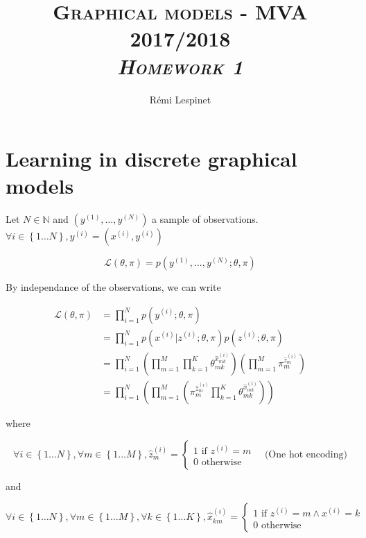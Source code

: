 \documentclass[a4paper, 11pt]{article}
\title{\textsc{Graphical models - MVA 2017/2018 \\ \emph{Homework 1}} }
\author{Rémi Lespinet}
\date{}
\newcommand{\intn}[2]{\left\{ #1 \dots #2 \right\}}
\begin{document}
\maketitle
\thispagestyle{fancy}

\section{Learning in discrete graphical models}

Let $N \in \mathbb{N}$ and $\left(y^{(1)}, \dots, y^{(N)}\right)$ a sample
of observations. $\forall i \in \intn{1}{N}, y^{(i)} = (x^{(i)}, y^{(i)})$

\begin{equation*}
  \mathcal{L}(\theta, \pi) = p(y^{(1)}, \dots, y^{(N)} ; \theta, \pi)
\end{equation*}

By independance of the observations, we can write

\begin{align*}
  \mathcal{L}(\theta, \pi) & = \prod_{i = 1}^{N} p(y^{(i)}; \theta, \pi) \\
  & = \prod_{i = 1}^{N} p(x^{(i)} | z^{(i)}; \theta, \pi) p(z^{(i)}; \theta, \pi) \\
  & = \prod_{i = 1}^{N} \left( \prod_{m = 1}^M \prod_{k = 1}^K \theta_{m k}^{\hat{x}^{(i)}_{m k}} \right) \left( \prod_{m = 1}^M \pi_m^{\hat{z}^{(i)}_m} \right) \\
  & = \prod_{i = 1}^{N} \left( \prod_{m = 1}^M \left( \pi_m^{\hat{z}^{(i)}_m} \prod_{k = 1}^K \theta_{m k}^{\hat{x}^{(i)}_{m k}} \right) \right)
\end{align*}

where

\begin{equation*}
  \forall i \in \intn{1}{N}, \forall m \in \intn{1}{M}, \hat{z}^{(i)}_m = \left\{
  \begin{array}{l}
    1 \text{ if } z^{(i)} = m \\
    0 \text{ otherwise }
  \end{array}
  \right. \hspace{1em}\text{(One hot encoding)}
\end{equation*}

and

\begin{equation*}
  \forall i \in \intn{1}{N}, \forall m \in \intn{1}{M}, \forall k \in \intn{1}{K}, \hat{x}^{(i)}_{k m} = \left\{
  \begin{array}{l}
    1 \text{ if } z^{(i)} = m \land x^{(i)} = k \\
    0 \text{ otherwise }
  \end{array}
  \right.
\end{equation*}
\end{document}
